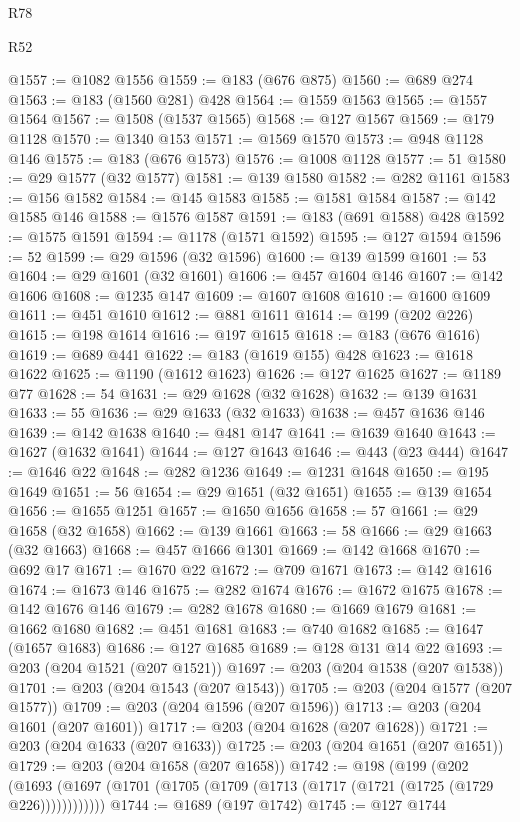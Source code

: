 \begin{lexlean}{R78}
\begin{lexlean}{R52}
\begin{coremodule}
{{{{{{{{{{{{{{{{{{{{{{{{{{{{{{{{{{{{{{{{{{{{{{{{{{{{{{{{{{{{{{{{{{{{{{{{{{{{{{{{{{{{{{{{{{{{{{{{{{{{{{{{{{{{{{{{{{{{{{{{{{{{{{{{{{{{{{{{{{{{{{{{{{{{{{{{{{{{{{{{{{{{{{{{{{{{{{{{{{{{{{{{{{{{{{{{{{{{{{@1557 := @1082 @1556
@1559 := @183 (@676 @875)
@1560 := @689 @274
@1563 := @183 (@1560 @281) @428
@1564 := @1559 @1563
@1565 := @1557 @1564
@1567 := @1508 (@1537 @1565)
@1568 := @127 @1567
@1569 := @179 @1128
@1570 := @1340 @153
@1571 := @1569 @1570
@1573 := @948 @1128 @146
@1575 := @183 (@676 @1573)
@1576 := @1008 @1128
@1577 := 51
@1580 := @29 @1577 (@32 @1577)
@1581 := @139 @1580
@1582 := @282 @1161
@1583 := @156 @1582
@1584 := @145 @1583
@1585 := @1581 @1584
@1587 := @142 @1585 @146
@1588 := @1576 @1587
@1591 := @183 (@691 @1588) @428
@1592 := @1575 @1591
@1594 := @1178 (@1571 @1592)
@1595 := @127 @1594
@1596 := 52
@1599 := @29 @1596 (@32 @1596)
@1600 := @139 @1599
@1601 := 53
@1604 := @29 @1601 (@32 @1601)
@1606 := @457 @1604 @146
@1607 := @142 @1606
@1608 := @1235 @147
@1609 := @1607 @1608
@1610 := @1600 @1609
@1611 := @451 @1610
@1612 := @881 @1611
@1614 := @199 (@202 @226)
@1615 := @198 @1614
@1616 := @197 @1615
@1618 := @183 (@676 @1616)
@1619 := @689 @441
@1622 := @183 (@1619 @155) @428
@1623 := @1618 @1622
@1625 := @1190 (@1612 @1623)
@1626 := @127 @1625
@1627 := @1189 @77
@1628 := 54
@1631 := @29 @1628 (@32 @1628)
@1632 := @139 @1631
@1633 := 55
@1636 := @29 @1633 (@32 @1633)
@1638 := @457 @1636 @146
@1639 := @142 @1638
@1640 := @481 @147
@1641 := @1639 @1640
@1643 := @1627 (@1632 @1641)
@1644 := @127 @1643
@1646 := @443 (@23 @444)
@1647 := @1646 @22
@1648 := @282 @1236
@1649 := @1231 @1648
@1650 := @195 @1649
@1651 := 56
@1654 := @29 @1651 (@32 @1651)
@1655 := @139 @1654
@1656 := @1655 @1251
@1657 := @1650 @1656
@1658 := 57
@1661 := @29 @1658 (@32 @1658)
@1662 := @139 @1661
@1663 := 58
@1666 := @29 @1663 (@32 @1663)
@1668 := @457 @1666 @1301
@1669 := @142 @1668
@1670 := @692 @17
@1671 := @1670 @22
@1672 := @709 @1671
@1673 := @142 @1616
@1674 := @1673 @146
@1675 := @282 @1674
@1676 := @1672 @1675
@1678 := @142 @1676 @146
@1679 := @282 @1678
@1680 := @1669 @1679
@1681 := @1662 @1680
@1682 := @451 @1681
@1683 := @740 @1682
@1685 := @1647 (@1657 @1683)
@1686 := @127 @1685
@1689 := @128 @131 @14 @22
@1693 := @203 (@204 @1521 (@207 @1521))
@1697 := @203 (@204 @1538 (@207 @1538))
@1701 := @203 (@204 @1543 (@207 @1543))
@1705 := @203 (@204 @1577 (@207 @1577))
@1709 := @203 (@204 @1596 (@207 @1596))
@1713 := @203 (@204 @1601 (@207 @1601))
@1717 := @203 (@204 @1628 (@207 @1628))
@1721 := @203 (@204 @1633 (@207 @1633))
@1725 := @203 (@204 @1651 (@207 @1651))
@1729 := @203 (@204 @1658 (@207 @1658))
@1742 := @198
    (@199
      (@202 (@1693 (@1697 (@1701 (@1705 (@1709 (@1713 (@1717 (@1721 (@1725 (@1729 @226))))))))))))
@1744 := @1689 (@197 @1742)
@1745 := @127 @1744
}}}}}}}}}}}}}}}}}}}}}}}}}}}}}}}}}}}}}}}}}}}}}}}}}}}}}}}}}}}}}}}}}}}}}}}}}}}}}}}}}}}}}}}}}}}}}}}}}}}}}}}}}}}}}}}}}}}}}}}}}}}}}}}}}}}}}}}}}}}}}}}}}}}}}}}}}}}}}}}}}}}}}}}}}}}}}}}}}}}}}}}}}}}}}}}}}}}}}}
\end{coremodule}
\end{lexlean}
\end{lexlean}
